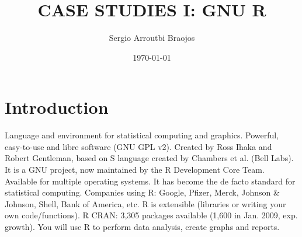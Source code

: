 \documentclass[11pt]{article}
\title{\textbf{CASE STUDIES I: GNU R}}
\author{Sergio Arroutbi Braojos}
\date{\today}
\begin{document}
\maketitle

\section{Introduction}
Language and environment for statistical computing and
graphics.
Powerful, easy-to-use and libre software (GNU GPL v2).
Created by Ross Ihaka and Robert Gentleman, based on S
language created by Chambers et al. (Bell Labs).
It is a GNU project, now maintained by the R Development
Core Team.
Available for multiple operating systems.
It has become the de facto standard for statistical computing.
Companies using R: Google, Pfizer, Merck, Johnson \&
Johnson, Shell, Bank of America, etc.
R is extensible (libraries or writing your own code/functions).
R CRAN: 3,305 packages available (1,600 in Jan. 2009, exp.
growth).
You will use R to perform data analysis, create graphs and
reports.

\section{}
\end{document}
